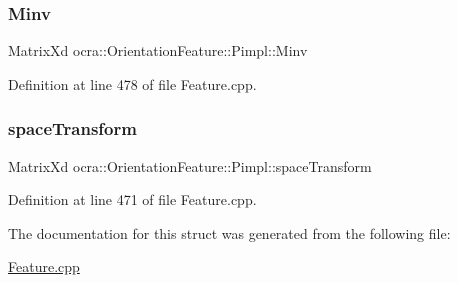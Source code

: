 \hypertarget{structocra_1_1OrientationFeature_1_1Pimpl_a4d3638027be99fabf73eefd55015ce44}{}\label{structocra_1_1OrientationFeature_1_1Pimpl_a4d3638027be99fabf73eefd55015ce44} 
\subsubsection{\texorpdfstring{Minv}{Minv}}
{\footnotesize\ttfamily Matrix\+Xd ocra\+::\+Orientation\+Feature\+::\+Pimpl\+::\+Minv}



Definition at line 478 of file Feature.\+cpp.

\hypertarget{structocra_1_1OrientationFeature_1_1Pimpl_aabbe93797831b01bda2453053e2a1224}{}\label{structocra_1_1OrientationFeature_1_1Pimpl_aabbe93797831b01bda2453053e2a1224} 
\subsubsection{\texorpdfstring{space\+Transform}{spaceTransform}}
{\footnotesize\ttfamily Matrix\+Xd ocra\+::\+Orientation\+Feature\+::\+Pimpl\+::space\+Transform}



Definition at line 471 of file Feature.\+cpp.



The documentation for this struct was generated from the following file\+:\begin{DoxyCompactItemize}
\item 
\hyperlink{Feature_8cpp}{Feature.\+cpp}\end{DoxyCompactItemize}
